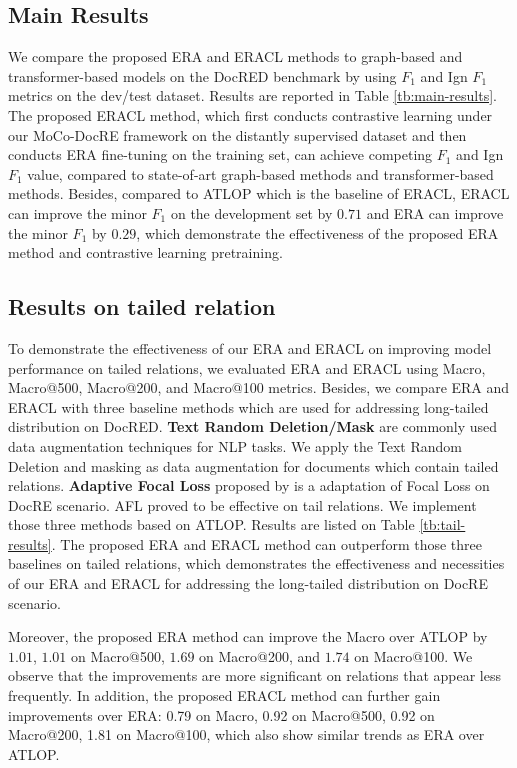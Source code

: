 \documentclass[11pt]{article}
\begin{document}
\subsection{Main Results}
We compare the proposed ERA and ERACL methods to graph-based and transformer-based models on the DocRED benchmark by using $F_1$ and Ign $F_1$ metrics on the dev/test dataset. Results are reported in Table \ref{tb:main-results}. The proposed ERACL method, which first conducts contrastive learning under our MoCo-DocRE framework on the distantly supervised dataset and then conducts ERA fine-tuning on the training set, can achieve competing $F_1$ and Ign $F_1$ value, compared to state-of-art graph-based methods and transformer-based methods. Besides, compared to ATLOP\citep{zhou_atlop_2021} which is the baseline of ERACL, ERACL can improve the minor $F_1$ on the development set by $0.71$ and ERA can improve the minor $F_1$ by $0.29$, which demonstrate the effectiveness of the proposed ERA method and contrastive learning pretraining.



\subsection{Results on tailed relation}
    To demonstrate the effectiveness of our ERA and ERACL on improving model performance on tailed relations, we evaluated ERA and ERACL using Macro, Macro@500, Macro@200, and Macro@100 metrics. Besides, we compare ERA and ERACL with three baseline methods which are used for addressing long-tailed distribution on DocRED. 
    \textbf{Text Random Deletion/Mask} are commonly used data augmentation techniques for NLP tasks. We apply the Text Random Deletion and masking as data augmentation for documents which contain  tailed relations. 
    \textbf{Adaptive Focal Loss} proposed by \citet{tan-etal-2022-document} is a adaptation of Focal Loss\citep{Lin_2017_ICCV} on DocRE scenario. AFL proved to be effective on tail relations. We implement those three methods based on ATLOP. Results are listed on Table \ref{tb:tail-results}. The proposed ERA and ERACL method can outperform those three baselines on tailed relations, which demonstrates the effectiveness and necessities of our ERA and ERACL for addressing the long-tailed distribution on DocRE scenario.
    
    Moreover, the proposed ERA method can improve the Macro over ATLOP by $1.01$, $1.01$ on Macro@500, $1.69$ on Macro@200, and $1.74$ on Macro@100. We observe that the improvements are more significant on relations that appear less frequently. In addition, the proposed ERACL method can further gain improvements over ERA: 0.79 on Macro, 0.92 on Macro@500, 0.92 on Macro@200, 1.81 on Macro@100, which also show similar trends as ERA over ATLOP.
    
\end{document}
